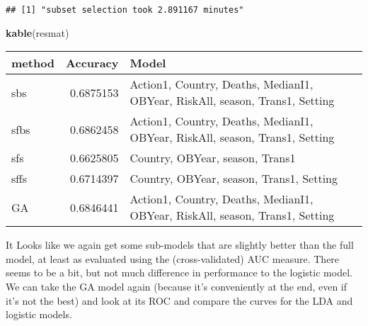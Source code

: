 \documentclass[]{article}
\newenvironment{Shaded}{\begin{snugshade}}{\end{snugshade}}
\newcommand{\CommentTok}[1]{\textcolor[rgb]{0.56,0.35,0.01}{\textit{#1}}}
\newcommand{\DataTypeTok}[1]{\textcolor[rgb]{0.13,0.29,0.53}{#1}}
\newcommand{\DecValTok}[1]{\textcolor[rgb]{0.00,0.00,0.81}{#1}}
\newcommand{\KeywordTok}[1]{\textcolor[rgb]{0.13,0.29,0.53}{\textbf{#1}}}
\newcommand{\NormalTok}[1]{#1}
\newcommand{\OperatorTok}[1]{\textcolor[rgb]{0.81,0.36,0.00}{\textbf{#1}}}
\newcommand{\StringTok}[1]{\textcolor[rgb]{0.31,0.60,0.02}{#1}}
\begin{document}
\begin{verbatim}
## [1] "subset selection took 2.891167 minutes"
\end{verbatim}

\begin{Shaded}
\begin{Highlighting}[]
\KeywordTok{kable}\NormalTok{(resmat)}
\end{Highlighting}
\end{Shaded}

\begin{longtable}[]{@{}lrl@{}}
\toprule
method & Accuracy & Model\tabularnewline
\midrule
\endhead
sbs & 0.6875153 & Action1, Country, Deaths, MedianI1, OBYear, RiskAll,
season, Trans1, Setting\tabularnewline
sfbs & 0.6862458 & Action1, Country, Deaths, MedianI1, OBYear, RiskAll,
season, Trans1, Setting\tabularnewline
sfs & 0.6625805 & Country, OBYear, season, Trans1\tabularnewline
sffs & 0.6714397 & Country, OBYear, season, Trans1,
Setting\tabularnewline
GA & 0.6846441 & Action1, Country, Deaths, MedianI1, OBYear, RiskAll,
season, Trans1, Setting\tabularnewline
\bottomrule
\end{longtable}

It Looks like we again get some sub-models that are slightly better than
the full model, at least as evaluated using the (cross-validated) AUC
measure. There seems to be a bit, but not much difference in performance
to the logistic model. We can take the GA model again (because it's
conveniently at the end, even if it's not the best) and look at its ROC
and compare the curves for the LDA and logistic models.

\begin{Shaded}
\end{Shaded}
\end{document}
